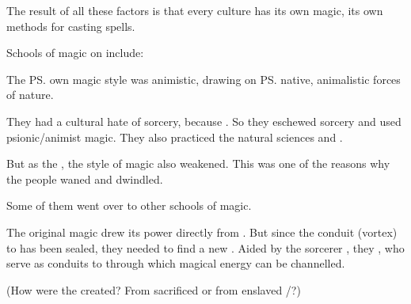 The result of all these factors is that every culture has its own magic, its own methods for casting spells. 

Schools of magic on \Miith{} include: 





\begin{gloss}
  
  
  
  
  \begin{comment}
    \paragraph{\Aryoth magic}
  \end{comment}
  The \ps{\aryothim} own magic style was animistic, drawing on \ps{\Miith} native, animalistic forces of nature. 
  
  They had a cultural hate of sorcery, because . 
  So they eschewed sorcery and used psionic/animist magic. 
  They also practiced the natural sciences and . 
  
  But as the , the \aryoth style of magic also weakened. 
  This was one of the reasons why the \aryoth{} people waned and dwindled. 
  
  Some of them went over to other schools of magic. 
  
  
  
  
  
  
  
  
  
  
  \begin{comment}
    \paragraph{\Bane magic}
  \end{comment}
  The original \bane{} magic drew its power directly from \Erebos{}. But since the conduit (vortex) to \Erebos{} has been sealed, they needed to find a new . Aided by the \nephilic{} sorcerer \Semiza, they , who serve as conduits to \Erebos{} through which magical energy can be channelled. 
  
  (How were the \Qliphoth{} created? 
  From sacrificed \banelords{} or from enslaved \pdaemons{}/\mdaemons{}?)
  

\end{gloss}

